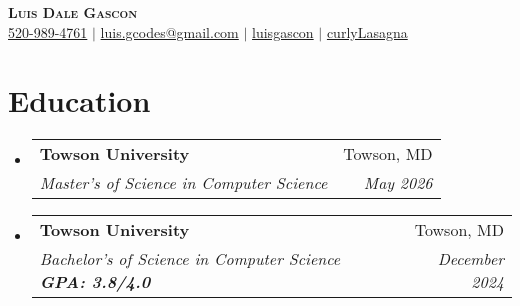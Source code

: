 \documentclass[letterpaper,11pt]{article}
\makeatletter
\newcommand{\resumeSubheading}[4]{
  \vspace{-2pt}\item
    \begin{tabular*}{0.97\textwidth}[t]{l@{\extracolsep{\fill}}r}
      \textbf{#1} & #2 \\
      \textit{\small#3} & \textit{\small #4} \\
    \end{tabular*}\vspace{-7pt}
}
\newcommand{\resumeSubHeadingListStart}{\begin{itemize}[leftmargin=0.15in, label={}]}
\newcommand{\resumeSubHeadingListEnd}{\end{itemize}}
\makeatother
\begin{document}

\begin{center}
  \textbf{\Huge \scshape Luis Dale Gascon} \\ \vspace{3pt}
  \small
  \faMobile \hspace{.5pt} \href{tel:5209894761}{520-989-4761}
  $|$
  \faAt \hspace{.5pt} \href{mailto:luis.gcodes@gmail.com}{luis.gcodes@gmail.com}
  $|$
  \faLinkedinSquare \hspace{.5pt} \href{https://www.linkedin.com/in/luisgascon/}{luisgascon}
  $|$
  \faGithub \hspace{.5pt} \href{https://github.com/curlyLasagna}{curlyLasagna}
\end{center}




\section{Education}
\vspace{3pt}
\resumeSubHeadingListStart

\resumeSubheading
{Towson University}{Towson, MD}
{Master's of Science in Computer Science \textbf{}}{May 2026}
\resumeSubheading
{Towson University}{Towson, MD}
{Bachelor's of Science in Computer Science \textbf{GPA: 3.8/4.0}}{December 2024}
\vspace{3pt}
\resumeSubHeadingListEnd



\end{document}
